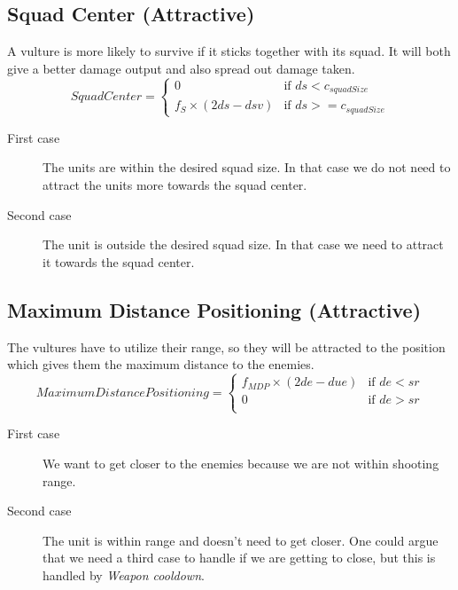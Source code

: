 	\subsection{Squad Center (Attractive)}
		\label{SCA_label}A vulture is more likely to survive if it sticks together with its squad. 
		It will both give a better damage output and also spread out damage taken.
		\begin{displaymath}
			SquadCenter  = \begin{cases}
					0 & \text{if } ds < c_{squadSize} \\
					f_{S} \times (2ds - dsv) & \text{if } ds >= c_{squadSize}
				\end{cases}		
		\end{displaymath}
		
		\begin{description}
			\item[First case] The units are within the desired squad size. In that case we do not need to attract the units more towards the squad center.
			\item[Second case] The unit is outside the desired squad size. In that case we need to attract it towards the squad center.
		\end{description}
	\subsection{Maximum Distance Positioning (Attractive)}
		The vultures have to utilize their range, so they will be attracted to the position which gives them the maximum distance to the enemies.
		\begin{displaymath}
			MaximumDistancePositioning = \begin{cases}
					f_{MDP} \times (2de - due) & \text{if } de < sr\\
					0 & \text{if } de > sr\\
				\end{cases}		
		\end{displaymath}
		\begin{description}
			\item[First case] We want to get closer to the enemies because we are not within shooting range.
			\item[Second case] The unit is within range and doesn't need to get closer. One could argue that we need a third case to handle if we are getting to close, but this is handled by \textit{Weapon cooldown}.
		\end{description}
		\pagebreak
